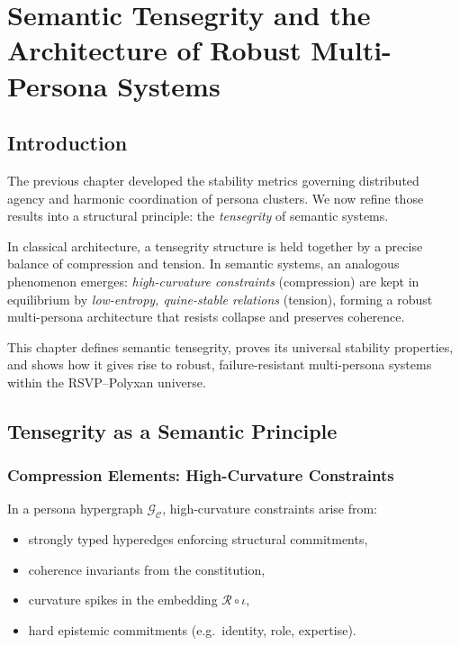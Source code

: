 \chapter{Semantic Tensegrity and the Architecture of Robust Multi-Persona Systems}
\label{ch:semantic-tensegrity}

\section{Introduction}

The previous chapter developed the stability metrics governing distributed
agency and harmonic coordination of persona clusters.  
We now refine those results into a structural principle:
the \emph{tensegrity} of semantic systems.

In classical architecture, a tensegrity structure is held together by a precise
balance of compression and tension.  
In semantic systems, an analogous phenomenon emerges:
\emph{high-curvature constraints} (compression) are kept in equilibrium by
\emph{low-entropy, quine-stable relations} (tension),
forming a robust multi-persona architecture that resists collapse and preserves coherence.

This chapter defines semantic tensegrity, proves its universal stability
properties, and shows how it gives rise to robust, failure-resistant multi-persona systems
within the RSVP–Polyxan universe.


\section{Tensegrity as a Semantic Principle}

\subsection{Compression Elements: High-Curvature Constraints}

In a persona hypergraph $\mathcal{G}_{\mathcal{C}}$,
high-curvature constraints arise from:

\begin{itemize}
    \item strongly typed hyperedges enforcing structural commitments,
    \item coherence invariants from the constitution,
    \item curvature spikes in the embedding $\mathcal{R}\circ\iota$,
    \item hard epistemic commitments (e.g.\ identity, role, expertise).
\end{itemize}

